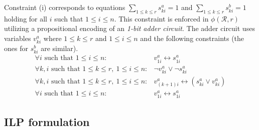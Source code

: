 \documentclass[12pt,a4paper]{article}
\begin{document}
Constraint (i) corresponds to equations $\sum_{1\leq k\leq r} s^a_{ki} = 1$ and $\sum_{1\leq k\leq r} s^b_{ki} = 1$ holding for all $i$ such that $1\leq i \leq n$.
This constraint is enforced in $\phi (\mathcal{R}, r)$ utilizing a propositional encoding of an \emph{1-bit adder circuit}.
The adder circuit uses variables $v^a_{ki}$ where $1\leq k \leq r$ and $1\leq i\leq n$ and the following constraints (the ones for $s^b_{ki}$ are similar).
\begin{eqnarray}
\forall i\text{ such that } 1\leq i\leq n: & v^a_{1i} \leftrightarrow s^a_{1i}\label{hipp-sat:clause1}\\
\forall k, i\text{ such that } 1\leq k \leq r,\ 1\leq i\leq n: & \neg v^a_{ki} \vee \neg s^a_{ki}\label{hipp-sat:clause2}\\
\forall k, i\text{ such that } 1\leq k \leq r,\ 1\leq i\leq n: & v^a_{(k+1)i} \leftrightarrow (s^a_{ki}\vee v^a_{ki} )\label{hipp-sat:clause3}\\
\forall i\text{ such that } 1\leq i\leq n: & v^a_{1i} \leftrightarrow s^a_{1i}\label{hipp-sat:clause4}
\end{eqnarray}



\subsection{ILP formulation}



\end{document}
